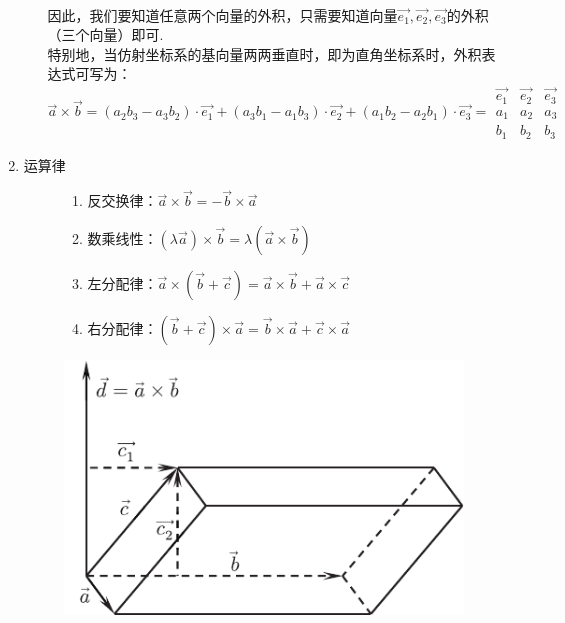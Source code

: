 \begin{enumerate}[1.]
\begin{enumerate}[]
\begin{equation}
\begin{aligned}
			\end{aligned}
		\end{equation}
		\qquad 因此，我们要知道任意两个向量的外积，只需要知道向量$\overrightarrow{e_1},\overrightarrow{e_2},\overrightarrow{e_3}$的外积（三个向量）即可. \\
		\hspace*{2em}特别地，当仿射坐标系的基向量两两垂直时，即为直角坐标系时，外积表达式可写为：
		\begin{equation}
			\overrightarrow{a} \times \overrightarrow{b}=\left( a_2b_3-a_3b_2\right)\cdot \overrightarrow{e_1}+\left(a_3b_1-a_1b_3\right)\cdot  \overrightarrow{e_2}+\left(a_1b_2-a_2b_1\right)\cdot \overrightarrow{e_3} =\begin{array}{|ccc|}
				\overrightarrow{e_1}& \overrightarrow{e_2} & \overrightarrow{e_3} \\
				a_1 & a_2 & a_3 \\
				b_1 & b_2 & b_3
			\end{array}
		\end{equation}
	\end{enumerate}
			\item  {\color{dy2}运算律}
	\begin{figure}[h]
		\begin{minipage}{0.5\linewidth}
			\begin{enumerate}[i]
						\setlength{\itemindent}{1.5em} 
				\setlength{\topsep}{0.01em}
				\setlength{\itemsep}{0.01em}
				\item 反交换律：$\overrightarrow{a}\times \overrightarrow{b}=-\overrightarrow{b}\times \overrightarrow{a}$
				\item 数乘线性：$(\lambda \overrightarrow{a})\times \overrightarrow{b}=\lambda (\overrightarrow{a}\times \overrightarrow{b})$
				\item 左分配律：$\overrightarrow{a}\times (\overrightarrow{b}+\overrightarrow{c})=\overrightarrow{a}\times \overrightarrow{b}+\overrightarrow{a}\times \overrightarrow{c}$
				\item 右分配律：$(\overrightarrow{b}+\overrightarrow{c})\times \overrightarrow{a}=\overrightarrow{b}\times \overrightarrow{a}+ \overrightarrow{c}\times \overrightarrow{a} $
			\end{enumerate}
		\end{minipage}
		\hfill
		\begin{minipage}{0.4\linewidth}
			\centering
			\includegraphics[width=0.9\linewidth]{picture/C-1/1.2/HHJ.pdf}

\end{minipage}
\end{figure}
\end{enumerate}
